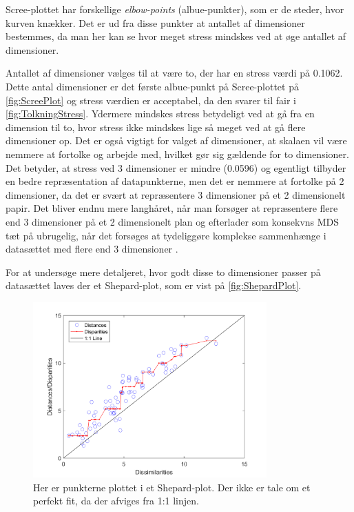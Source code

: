 \noindent Scree-plottet har forskellige \textit{elbow-points} (albue-punkter), som er de steder, hvor kurven knækker. Det er ud fra disse punkter at antallet af dimensioner bestemmes, da man her kan se hvor meget stress mindskes ved at øge antallet af dimensioner. 

\noindent Antallet af dimensioner vælges til at være to, der har en stress værdi på 0.1062. Dette antal dimensioner er det første albue-punkt på Scree-plottet på \autoref{fig:ScreePlot} og stress værdien er acceptabel, da den svarer til fair i \autoref{fig:TolkningStress}. Ydermere mindskes stress betydeligt ved at gå fra en dimension til to, hvor stress ikke mindskes lige så meget ved at gå flere dimensioner op. Det er også vigtigt for valget af dimensioner, at skalaen vil være nemmere at fortolke og arbejde med, hvilket gør sig gældende for to dimensioner. Det betyder, at stress ved 3 dimensioner er mindre (0.0596) og egentligt tilbyder en bedre repræsentation af datapunkterne, men det er nemmere at fortolke på 2 dimensioner, da det er svært at repræsentere 3 dimensioner på et 2 dimensionelt papir. Det bliver endnu mere langhåret, når man forsøger at repræsentere flere end 3 dimensioner på et 2 dimensionelt plan og efterlader som konsekvns MDS tæt på ubrugelig, når det forsøges at tydeliggøre komplekse sammenhænge i datasættet med flere end 3 dimensioner \parencite{Borgatti1997}. 

For at undersøge mere detaljeret, hvor godt disse to dimensioner passer på datasættet laves der et Shepard-plot, som er vist på \autoref{fig:ShepardPlot}.

\begin{figure}[H]
\centering
\includegraphics[width = 0.8\textwidth]{Figure/Sheppard_plot.png} 
\caption{Her er punkterne plottet i et Shepard-plot. Der ikke er tale om et perfekt fit, da der afviges fra 1:1 linjen.}
\label{fig:ShepardPlot}
\end{figure}

